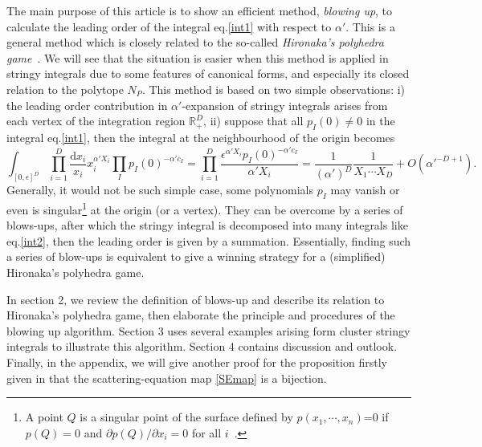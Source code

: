\documentclass[12pt]{article}
\theoremstyle{definition}
\theoremstyle{plain}
\newcommand{\dif}{\mathrm{d}} %
\begin{document}
The main purpose of this article is to show an efficient method, {\it{blowing up}}, %
to calculate the leading order of the integral eq.\eqref{int1} with respect to $\alpha'$. This is a general method which is closely related to the so-called \emph{Hironaka's polyhedra game}~\cite{}. We will see that the situation is easier when this method is applied in stringy integrals due to some features of canonical forms, and especially its closed relation to the polytope $N_{P}$. This method is based on two simple observations: i) the leading order contribution in $\alpha'$-expansion of stringy integrals arises from each vertex of the integration region $\mathds{R}_{+}^{D}$, ii) suppose that all $p_I(0)\neq 0$ in the integral eq.\eqref{int1}, then the integral at the neighbourhood of the origin becomes 
\begin{equation}\label{int2}
	\int_{[0,\epsilon]^D}\prod_{i=1}^D\frac{\dif x_i}{x_i}x_i^{\alpha' X_i} \prod_{I}p_{I}(0)^{-\alpha' c_{I}}
	=\prod_{i=1}^D\frac{\epsilon^{\alpha' X_i}p_{I}(0)^{-\alpha' c_{I}}}{\alpha' X_i}
	= \frac{1}{(\alpha')^D}\frac{1}{X_1\cdots X_D}+O(\alpha'^{-D+1}).
\end{equation}
Generally, it would not be such simple case, some polynomials $p_{I}$ may vanish or even is singular\footnote{A point $Q$ is a singular point of the surface defined by $p(x_{1},\cdots,x_{n})$=0 if $p(Q)=0$ and $\partial p(Q)/\partial x_{i} =0$ for all $i$~\cite{}. } at the origin (or a vertex).
They can be overcome by a series of blows-ups, after which the stringy integral is decomposed into many integrals like eq.\eqref{int2}, then the leading order is given by a summation. %
Essentially, finding such a series of blow-ups is equivalent to give a winning strategy for a (simplified) Hironaka's polyhedra game.


In section 2, we review the definition of blows-up and describe its relation to Hironaka's polyhedra game, then elaborate the principle and procedures of the blowing up algorithm. Section 3 uses several examples arising form cluster stringy integrals to illustrate this algorithm. Section 4 contains discussion and outlook. Finally, in the appendix, we will give another proof for the proposition firstly given in \cite{Arkani-Hamed:2017tmz} that the scattering-equation map \eqref{SEmap} is a bijection. 
\end{document}
